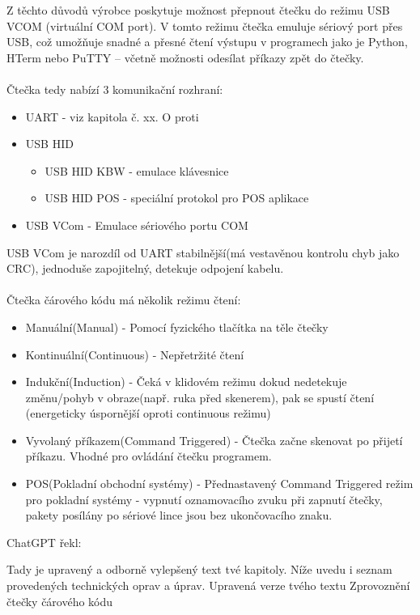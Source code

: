 Z těchto důvodů výrobce poskytuje možnost přepnout čtečku do režimu USB VCOM (virtuální COM port). V tomto režimu čtečka emuluje sériový port přes USB, což umožňuje snadné a přesné čtení výstupu v programech jako je Python, HTerm nebo PuTTY – včetně možnosti odesílat příkazy zpět do čtečky.
\\\\
Čtečka tedy nabízí 3 komunikační rozhraní:
\begin{itemize}
    \item UART - viz kapitola č. xx. O proti 
    \item USB HID
    \begin{itemize}
        \item USB HID KBW - emulace klávesnice
        \item USB HID POS - speciální protokol pro POS aplikace 
    \end{itemize}
    \item USB VCom - Emulace sériového portu COM
\end{itemize}
USB VCom je narozdíl od UART stabilnější(má vestavěnou kontrolu chyb jako CRC), jednoduše zapojitelný, detekuje odpojení kabelu. 
\\\\
Čtečka čárového kódu má několik režimu čtení:
\begin{itemize}
    \item Manuální(Manual) - Pomocí fyzického tlačítka na těle čtečky
    \item Kontinuální(Continuous) - Nepřetržité čtení
    \item Indukční(Induction) - Čeká v klidovém režimu dokud nedetekuje změnu/pohyb v obraze(např. ruka před skenerem), pak se spustí čtení (energeticky úspornější oproti continuous režimu)
    \item Vyvolaný příkazem(Command Triggered) - Čtečka začne skenovat po přijetí příkazu. Vhodné pro ovládání čtečku programem.
    \item POS(Pokladní obchodní systémy) - Přednastavený Command Triggered režim pro pokladní systémy - vypnutí oznamovacího zvuku při zapnutí čtečky, pakety posílány po sériové lince jsou bez ukončovacího znaku.
\end{itemize}
ChatGPT řekl:

Tady je upravený a odborně vylepšený text tvé kapitoly. Níže uvedu i seznam provedených technických oprav a úprav.
Upravená verze tvého textu
Zprovoznění čtečky čárového kódu

\label{zprovozeni_ctecky}

